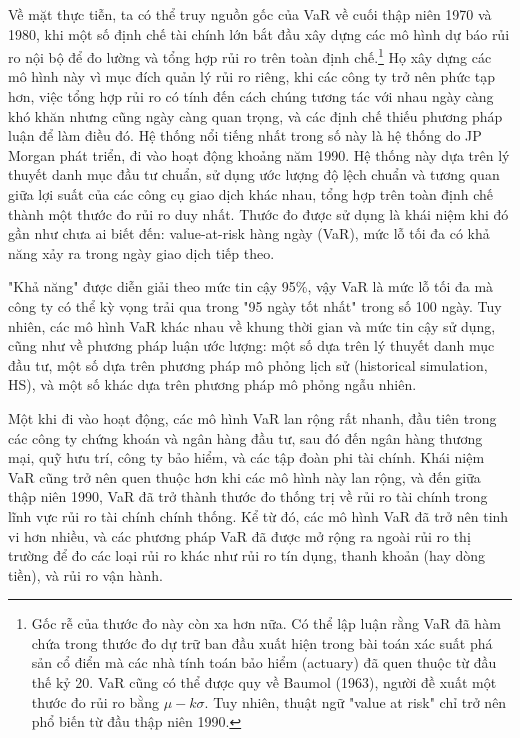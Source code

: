 Về mặt thực tiễn, ta có thể truy nguồn gốc của VaR về cuối thập niên 1970 và 1980, khi một số định chế tài chính lớn bắt đầu xây dựng các mô hình dự báo rủi ro nội bộ để đo lường và tổng hợp rủi ro trên toàn định chế.\footnote{Gốc rễ của thước đo này còn xa hơn nữa. Có thể lập luận rằng VaR đã hàm chứa trong thước đo dự trữ ban đầu xuất hiện trong bài toán xác suất phá sản cổ điển mà các nhà tính toán bảo hiểm (actuary) đã quen thuộc từ đầu thế kỷ 20. VaR cũng có thể được quy về Baumol (1963), người đề xuất một thước đo rủi ro bằng $\mu - k\sigma$. Tuy nhiên, thuật ngữ "value at risk" chỉ trở nên phổ biến từ đầu thập niên 1990.} Họ xây dựng các mô hình này vì mục đích quản lý rủi ro riêng, khi các công ty trở nên phức tạp hơn, việc tổng hợp rủi ro có tính đến cách chúng tương tác với nhau ngày càng khó khăn nhưng cũng ngày càng quan trọng, và các định chế thiếu phương pháp luận để làm điều đó. Hệ thống nổi tiếng nhất trong số này là hệ thống do JP Morgan phát triển, đi vào hoạt động khoảng năm 1990. Hệ thống này dựa trên lý thuyết danh mục đầu tư chuẩn, sử dụng ước lượng độ lệch chuẩn và tương quan giữa lợi suất của các công cụ giao dịch khác nhau, tổng hợp trên toàn định chế thành một thước đo rủi ro duy nhất. Thước đo được sử dụng là khái niệm khi đó gần như chưa ai biết đến: value-at-risk hàng ngày (VaR), mức lỗ tối đa có khả năng xảy ra trong ngày giao dịch tiếp theo.

"Khả năng" được diễn giải theo mức tin cậy 95\%, vậy VaR là mức lỗ tối đa mà công ty có thể kỳ vọng trải qua trong "95 ngày tốt nhất" trong số 100 ngày. Tuy nhiên, các mô hình VaR khác nhau về khung thời gian và mức tin cậy sử dụng, cũng như về phương pháp luận ước lượng: một số dựa trên lý thuyết danh mục đầu tư, một số dựa trên phương pháp mô phỏng lịch sử (historical simulation, HS), và một số khác dựa trên phương pháp mô phỏng ngẫu nhiên.

Một khi đi vào hoạt động, các mô hình VaR lan rộng rất nhanh, đầu tiên trong các công ty chứng khoán và ngân hàng đầu tư, sau đó đến ngân hàng thương mại, quỹ hưu trí, công ty bảo hiểm, và các tập đoàn phi tài chính. Khái niệm VaR cũng trở nên quen thuộc hơn khi các mô hình này lan rộng, và đến giữa thập niên 1990, VaR đã trở thành thước đo thống trị về rủi ro tài chính trong lĩnh vực rủi ro tài chính chính thống. Kể từ đó, các mô hình VaR đã trở nên tinh vi hơn nhiều, và các phương pháp VaR đã được mở rộng ra ngoài rủi ro thị trường để đo các loại rủi ro khác như rủi ro tín dụng, thanh khoản (hay dòng tiền), và rủi ro vận hành.

